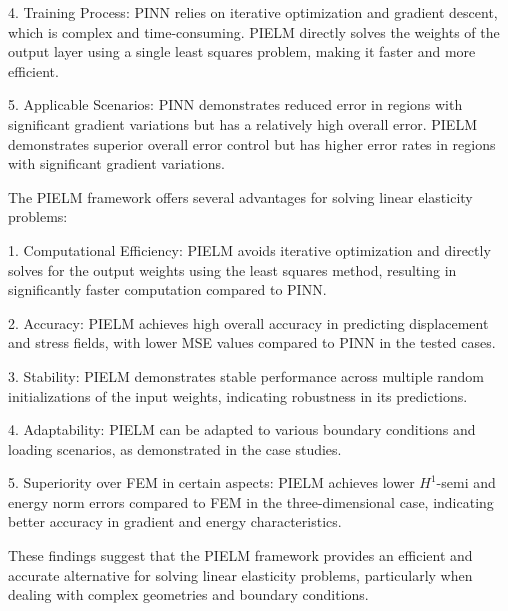 \documentclass[11pt]{article}
\begin{document}
4. Training Process: PINN relies on iterative optimization and gradient descent, which is complex and time-consuming. PIELM directly solves the weights of the output layer using a single least squares problem, making it faster and more efficient.

5. Applicable Scenarios: PINN demonstrates reduced error in regions with significant gradient variations but has a relatively high overall error. PIELM demonstrates superior overall error control but has higher error rates in regions with significant gradient variations.

The PIELM framework offers several advantages for solving linear elasticity problems:

1. Computational Efficiency: PIELM avoids iterative optimization and directly solves for the output weights using the least squares method, resulting in significantly faster computation compared to PINN.

2. Accuracy: PIELM achieves high overall accuracy in predicting displacement and stress fields, with lower MSE values compared to PINN in the tested cases.

3. Stability: PIELM demonstrates stable performance across multiple random initializations of the input weights, indicating robustness in its predictions.

4. Adaptability: PIELM can be adapted to various boundary conditions and loading scenarios, as demonstrated in the case studies.

5. Superiority over FEM in certain aspects: PIELM achieves lower $H^1$-semi and energy norm errors compared to FEM in the three-dimensional case, indicating better accuracy in gradient and energy characteristics.

These findings suggest that the PIELM framework provides an efficient and accurate alternative for solving linear elasticity problems, particularly when dealing with complex geometries and boundary conditions.
\end{document}
